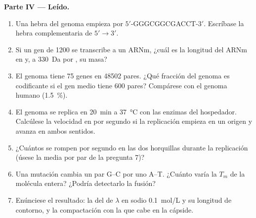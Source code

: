 \begin{problem}
\medskip
\noindent\textbf{Parte IV --- Leído.}
\begin{enumerate}[resume]
  \item Una hebra del genoma empieza por $5'$-GGGCGGCGACCT-$3'$. Escríbase
        la hebra complementaria de $5' \to 3'$.
  \item Si un gen de \num{1200}  se transcribe a un ARNm,
        ¿cuál es la longitud del ARNm en  y, a \qty{330}{Da} por
        , su masa?
  \item El genoma tiene \qty{75}{} genes en \num{48502} pares. ¿Qué
        fracción del genoma es codificante si el gen medio tiene \num{600}
        pares? Compárese con el genoma humano (\qty{1.5}{\%}).
  \item El genoma se replica en \qty{20}{min} a \qty{37}{\celsius} con las
        enzimas del hospedador. Calcúlese la velocidad en 
        por segundo si la replicación empieza en un origen y avanza en
        ambos sentidos.
  \item ¿Cuántos  se rompen por segundo en las dos
        horquillas durante la replicación (úsese la media por par de la
        pregunta 7)?
  \item Una mutación cambia un par G--C por uno A--T. ¿Cuánto varía la
        $T_m$ de la molécula entera? ¿Podría detectarlo la fusión?
  \item Enúnciese el resultado: la  del  de
        $\lambda$ en sodio \qty{0.1}{mol/L} y su longitud de contorno, y la
        compactación con la que cabe en la cápside.
\end{enumerate}
\end{problem}
